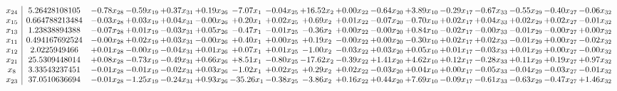 \documentclass[9pt]{article}
\begin{document}
 \[\begin{array}{c| c c@{\hskip 2pt} c@{\hskip 2pt} c@{\hskip 2pt} c@{\hskip 2pt} c@{\hskip 2pt} c@{\hskip 2pt} c@{\hskip 2pt} c@{\hskip 2pt} c@{\hskip 2pt} c@{\hskip 2pt} c@{\hskip 2pt} c@{\hskip 2pt} c@{\hskip 2pt} c@{\hskip 2pt} c@{\hskip 2pt} }
 x_{24}   &  5.26428108105 & -0.78 x_{28} & -0.59 x_{19} & +  0.37 x_{31} & +  0.19 x_{26} & -7.07 x_{1} & -0.04 x_{25} & + 16.52 x_{2} & +  0.00 x_{22} & -0.64 x_{20} & +  3.89 x_{10} & -0.29 x_{17} & -0.67 x_{33} & -0.55 x_{29} & -0.40 x_{27} & -0.06 x_{32}\\
 x_{15}   &  0.664788213484 & -0.03 x_{28} & +  0.03 x_{19} & +  0.04 x_{31} & -0.00 x_{26} & +  0.20 x_{1} & +  0.02 x_{25} & +  0.69 x_{2} & +  0.01 x_{22} & -0.07 x_{20} & -0.70 x_{10} & +  0.02 x_{17} & +  0.04 x_{33} & +  0.02 x_{29} & +  0.02 x_{27} & -0.01 x_{32}\\
 x_{13}   &  1.23838894388 & -0.07 x_{28} & +  0.01 x_{19} & -0.03 x_{31} & +  0.05 x_{26} & -0.47 x_{1} & -0.01 x_{25} & -0.36 x_{2} & +  0.00 x_{22} & -0.00 x_{20} & +  0.84 x_{10} & -0.02 x_{17} & -0.00 x_{33} & -0.01 x_{29} & -0.00 x_{27} & +  0.00 x_{32}\\
 x_{11}   &  0.494167692524 & -0.00 x_{28} & +  0.02 x_{19} & +  0.03 x_{31} & -0.00 x_{26} & +  0.40 x_{1} & +  0.00 x_{25} & +  0.19 x_{2} & -0.00 x_{22} & +  0.00 x_{20} & -0.30 x_{10} & +  0.02 x_{17} & +  0.02 x_{33} & -0.01 x_{29} & +  0.00 x_{27} & -0.02 x_{32}\\
 x_{12}   &  2.0225949466 & +  0.01 x_{28} & -0.00 x_{19} & -0.04 x_{31} & +  0.01 x_{26} & +  0.07 x_{1} & +  0.01 x_{25} & -1.00 x_{2} & -0.03 x_{22} & +  0.03 x_{20} & +  0.05 x_{10} & +  0.01 x_{17} & -0.03 x_{33} & +  0.01 x_{29} & +  0.00 x_{27} & -0.00 x_{32}\\
 x_{21}   &  25.5309448014 & +  0.08 x_{28} & -0.73 x_{19} & -0.49 x_{31} & +  0.66 x_{26} & +  8.51 x_{1} & -0.80 x_{25} & -17.62 x_{2} & -0.39 x_{22} & +  1.41 x_{20} & +  4.62 x_{10} & +  0.12 x_{17} & -0.28 x_{33} & +  0.11 x_{29} & +  0.19 x_{27} & +  0.97 x_{32}\\
 x_{8}   &  3.33543237451 & -0.01 x_{28} & -0.01 x_{19} & -0.02 x_{31} & +  0.03 x_{26} & -1.02 x_{1} & +  0.02 x_{25} & +  0.29 x_{2} & +  0.02 x_{22} & -0.03 x_{20} & +  0.04 x_{10} & +  0.00 x_{17} & -0.05 x_{33} & -0.04 x_{29} & -0.03 x_{27} & -0.01 x_{32}\\
 x_{23}   &  37.0510636694 & -0.01 x_{28} & -1.25 x_{19} & -0.24 x_{31} & +  0.93 x_{26} & -35.26 x_{1} & -0.38 x_{25} & -3.86 x_{2} & +  0.16 x_{22} & +  0.44 x_{20} & +  7.69 x_{10} & -0.09 x_{17} & -0.61 x_{33} & -0.63 x_{29} & -0.47 x_{27} & +  1.46 x_{32}\\

\end{array}\]
\end{document}
